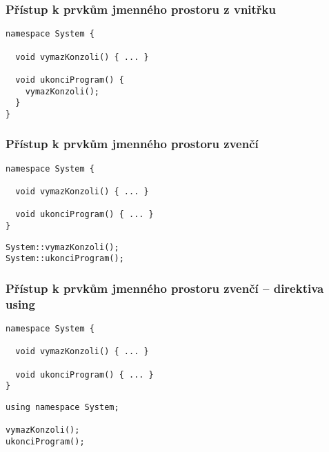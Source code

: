 \begin{frame}[fragile]
\frametitle{Přístup k prvkům jmenného prostoru z vnitřku}
\begin{yesblock}
\begin{lstlisting}
namespace System {

  void vymazKonzoli() { ... }

  void ukonciProgram() { 
    vymazKonzoli();
  }
}
\end{lstlisting}
\end{yesblock}
\end{frame}

\begin{frame}[fragile]
\frametitle{Přístup k prvkům jmenného prostoru zvenčí}
\begin{yesblock}
\begin{lstlisting}
namespace System {

  void vymazKonzoli() { ... }

  void ukonciProgram() { ... }
}
\end{lstlisting}
\end{yesblock}

\begin{yesblock}
\begin{lstlisting}
System::vymazKonzoli();
System::ukonciProgram();
\end{lstlisting}
\end{yesblock}
\end{frame}


\begin{frame}[fragile]
\frametitle{Přístup k prvkům jmenného prostoru zvenčí -- direktiva using}
\begin{yesblock}
\begin{lstlisting}
namespace System {

  void vymazKonzoli() { ... }

  void ukonciProgram() { ... }
}
\end{lstlisting}
\end{yesblock}

\begin{yesblock}
\begin{lstlisting}
using namespace System;

vymazKonzoli();
ukonciProgram();
\end{lstlisting}
\end{yesblock}
\end{frame}



